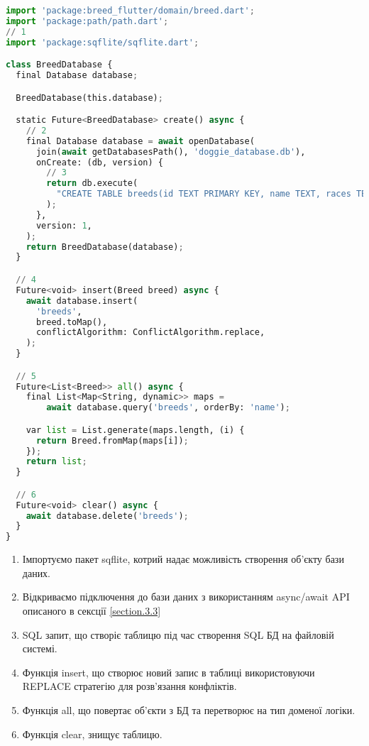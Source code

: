 \begin{lstlisting}[style=light, language=Python,label={lst:flutter_sqflite},caption=Flutter SQFLITE]
import 'package:breed_flutter/domain/breed.dart';
import 'package:path/path.dart';
// 1
import 'package:sqflite/sqflite.dart';

class BreedDatabase {
  final Database database;

  BreedDatabase(this.database);

  static Future<BreedDatabase> create() async {
    // 2
    final Database database = await openDatabase(
      join(await getDatabasesPath(), 'doggie_database.db'),
      onCreate: (db, version) {
        // 3
        return db.execute(
          "CREATE TABLE breeds(id TEXT PRIMARY KEY, name TEXT, races TEXT, isFavorite INTEGER)",
        );
      },
      version: 1,
    );
    return BreedDatabase(database);
  }

  // 4
  Future<void> insert(Breed breed) async {
    await database.insert(
      'breeds',
      breed.toMap(),
      conflictAlgorithm: ConflictAlgorithm.replace,
    );
  }

  // 5
  Future<List<Breed>> all() async {
    final List<Map<String, dynamic>> maps =
        await database.query('breeds', orderBy: 'name');

    var list = List.generate(maps.length, (i) {
      return Breed.fromMap(maps[i]);
    });
    return list;
  }

  // 6
  Future<void> clear() async {
    await database.delete('breeds');
  }
}
\end{lstlisting}

\begin{enumerate}
    \item Імпортуємо пакет sqflite, котрий надає можливість створення об'єкту бази даних.
    \item Відкриваємо підключення до бази даних з використанням async/await API описаного в сексції \ref{section.3.3}
    \item SQL запит, що створіє таблицю під час створення SQL БД на файловій системі.
    \item Функція insert, що створює новий запис в таблиці використовуючи REPLACE стратегію для розв'язання конфліктів.
    \item Функція all, що повертає об'єкти з БД та перетворює на тип доменої логіки.
    \item Функція clear, знищує таблицю.
\end{enumerate}


